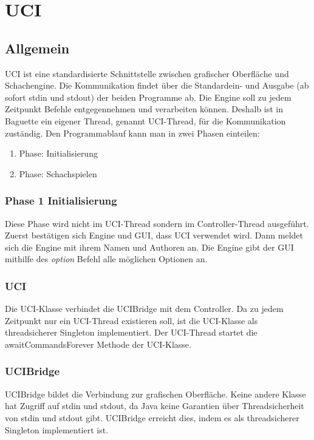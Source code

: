 \def \citeuci[#1]{\cite[l. #1]{uci}}
\section{UCI}\label{sec:uci}
\subsection{Allgemein}\label{subsec:allgemein}
UCI ist eine standardisierte Schnittstelle zwischen grafischer Oberfl\"ache und Schachengine.
Die Kommunikation findet \"uber die Standardein- und Ausgabe (ab sofort stdin und stdout) der beiden Programme ab.\citeuci[9]
\newline
Die Engine soll zu jedem Zeitpunkt Befehle entgegennehmen und verarbeiten k\"onnen.\citeuci[15]
Deshalb ist in Baguette ein eigener Thread, genannt UCI-Thread, f\"ur die Kommunikation zust\"andig.
\newline
Den Programmablauf kann man in zwei Phasen einteilen:
\begin{enumerate}
    \item Phase: Initialisierung
    \item Phase: Schachspielen
\end{enumerate}
\subsubsection{Phase 1 Initialisierung}
Diese Phase wird nicht im UCI-Thread sondern im Controller-Thread ausgef\"uhrt.
Zuerst best\"atigen sich Engine und GUI, dass UCI verwendet wird. \citeuci[59 - 66]
Dann meldet sich die Engine mit ihrem Namen und Authoren an.
Die Engine gibt der GUI mithilfe des \textit{option} Befehl alle m\"oglichen Optionen an.
\subsubsection{UCI}
Die UCI-Klasse verbindet die UCIBridge mit dem Controller.
Da zu jedem Zeitpunkt nur ein UCI-Thread existieren soll, ist die UCI-Klasse als threadsicherer Singleton implementiert.
Der UCI-Thread startet die awaitCommandsForever Methode der UCI-Klasse.

\subsubsection{UCIBridge}
UCIBridge bildet die Verbindung zur grafischen Oberfl\"ache.
Keine andere Klasse hat Zugriff auf stdin und stdout, da Java keine Garantien \"uber Threadsicherheit von stdin und stdout gibt.
UCIBridge erreicht dies, indem es als threadsicherer Singleton implementiert ist.
\pagebreak